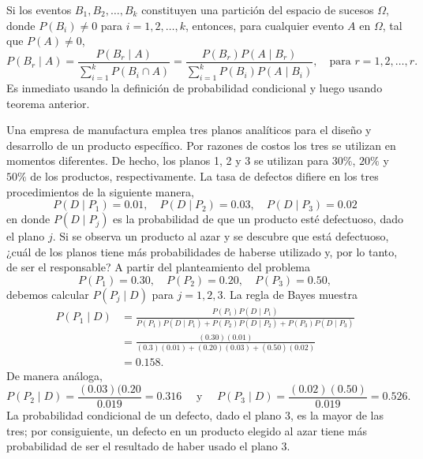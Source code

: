 \begin{theorem}{}{}
    Si los eventos $B_1, B_2, \dots, B_k$ constituyen una partición del espacio de sucesos $\Omega$, donde $P(B_i) \neq 0$ para $i = 1, 2, \dots, k$, entonces, para cualquier evento $A$ en $\Omega$, tal que $P(A) \neq 0$,
    $$P(B_r \mid A) = \frac{P(B_r \mid A)}{\displaystyle\sum_{i=1}^{k}P(B_i \cap A)} = \frac{P(B_r) P(A \mid B_r)}{\displaystyle\sum_{i=1}^{k}P(B_i)P(A \mid B_i)}, \quad \text{para } r = 1, 2, \dots, r.$$
    \tcblower
    \solucion Es inmediato usando la definición de probabilidad condicional y luego usando teorema anterior.
\end{theorem}

\newpage

\begin{examplebox}{}{}
    Una empresa de manufactura emplea tres planos analíticos para el diseño y desarrollo de un producto específico. Por razones de costos los tres se utilizan en momentos diferentes. De hecho, los planos 1, 2 y 3 se utilizan para $30\%$, $20\%$ y $50\%$ de los productos, respectivamente. La tasa de defectos difiere en los tres procedimientos de la siguiente manera,
    $$P(D \mid P_1) = 0.01, \quad P(D \mid P_2) = 0.03, \quad P(D \mid P_3) = 0.02$$
    en donde $P(D \mid P_j)$ es la probabilidad de que un producto esté defectuoso, dado el plano $j$. Si se observa un producto al azar y se descubre que está defectuoso, ¿cuál de los planos tiene más probabilidades de haberse utilizado y, por lo tanto, de ser el responsable?
    \tcblower
    \solucion A partir del planteamiento del problema
    $$P(P_1) = 0.30, \quad P(P_2) = 0.20, \quad P(P_3) = 0.50,$$
    debemos calcular $P(P_j \mid D)$ para $j = 1, 2, 3$. La regla de Bayes muestra
    \begin{align*}
        P(P_1 \mid D) & = \frac{P(P_1) P(D \mid P_1)}{P(P_1)P(D \mid P_1) + P(P_2)P(D \mid P_2) + P(P_3)P(D \mid P_3)} \\
        & = \frac{(0.30)(0.01)}{(0.3)(0.01) + (0.20)(0.03) + (0.50)(0.02)} \\
        & = 0.158.
    \end{align*}
    De manera análoga,
    $$P(P_2 \mid D) = \frac{(0.03)(0.20}{0.019} = 0.316 \quad \text{ y } \quad P(P_3 \mid D) = \frac{(0.02)(0.50)}{0.019} = 0.526.$$
    La probabilidad condicional de un defecto, dado el plano 3, es la mayor de las tres; por consiguiente, un defecto en un producto elegido al azar tiene más probabilidad de ser el resultado de haber usado el plano 3.
\end{examplebox}

